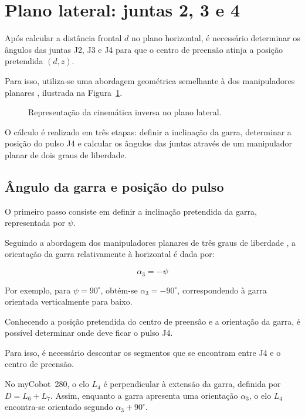 
\section{Plano lateral: juntas 2, 3 e 4}
\label{sec:ik_lateral}

Após calcular a distância frontal $d$ no plano horizontal, é necessário determinar os ângulos das juntas J2, J3 e J4 para que o centro de preensão atinja a posição pretendida $(d,z)$.

Para isso, utiliza-se uma abordagem geométrica semelhante à dos manipuladores planares \cite{bicho_2dof,bicho_3dof}, ilustrada na Figura~\ref{fig:2dof}.

\begin{figure}[htbp]
    \centering
    \resizebox{0.6\textwidth}{!}{
        
    }
    \caption{Representação da cinemática inversa no plano lateral.}
    \label{fig:2dof}
\end{figure}

O cálculo é realizado em três etapas: definir a inclinação da garra, determinar a posição do pulso J4 e calcular os ângulos das juntas através de um manipulador planar de dois graus de liberdade.

\subsection{Ângulo da garra e posição do pulso}

O primeiro passo consiste em definir a inclinação pretendida da garra, representada por $\psi$.

Seguindo a abordagem dos manipuladores planares de três graus de liberdade \cite{bicho_3dof}, a orientação da garra relativamente à horizontal é dada por:

\begin{equation}
    \alpha_3=-\psi
    \label{eq:ik_alpha3}
\end{equation}

Por exemplo, para $\psi=90^\circ$, obtém-se $\alpha_3=-90^\circ$, correspondendo à garra orientada verticalmente para baixo.

Conhecendo a posição pretendida do centro de preensão e a orientação da garra, é possível determinar onde deve ficar o pulso J4.

Para isso, é necessário descontar os segmentos que se encontram entre J4 e o centro de preensão.

No myCobot~280, o elo $L_4$ é perpendicular à extensão da garra, definida por $D=L_6+L_7$. Assim, enquanto a garra apresenta uma orientação $\alpha_3$, o elo $L_4$ encontra-se orientado segundo $\alpha_3+90^\circ$.

